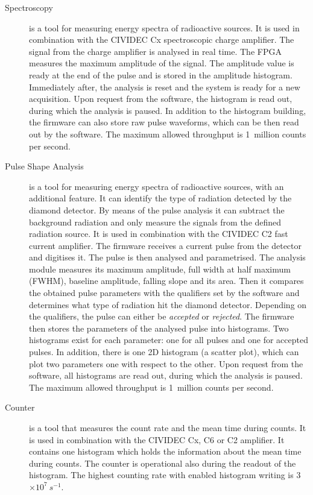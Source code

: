 \begin{description}
\item[Spectroscopy] is a tool for measuring energy spectra of radioactive sources. It is used in combination with the CIVIDEC Cx spectroscopic charge amplifier. The signal from the charge amplifier is analysed in real time. The FPGA measures the maximum amplitude of the signal. The amplitude value is ready at the end of the pulse and is stored in the amplitude histogram. Immediately after, the analysis is reset and the system is ready for a new acquisition. Upon request from the software, the histogram is read out, during which the analysis is paused. In addition to the histogram building, the firmware can also store raw pulse waveforms, which can be then read out by the software. The maximum allowed throughput is 1~million counts per second.

\item[Pulse Shape Analysis] is a tool for measuring energy spectra of radioactive sources, with an additional feature. It can identify the type of radiation detected by the diamond detector. By means of the pulse analysis it can subtract the background radiation and only measure the signals from the defined radiation source. It is used in combination with the CIVIDEC C2 fast current amplifier. The firmware receives a current pulse from the detector and digitises it. The pulse is then analysed and parametrised. The analysis module measures its maximum amplitude, full width at half maximum (FWHM), baseline amplitude, falling slope and its area. Then it compares the obtained pulse parameters with the qualifiers set by the software and determines what type of radiation hit the diamond detector. Depending on the qualifiers, the pulse can either be \emph{accepted} or \emph{rejected}. The firmware then stores the parameters of the analysed pulse into histograms. Two histograms exist for each parameter: one for all pulses and one for accepted pulses. In addition, there is one 2D histogram (a scatter plot), which can plot two parameters one with respect to the other. Upon request from the software, all histograms are read out, during which the analysis is paused. The maximum allowed throughput is 1~million counts per second.

\item[Counter] is a tool that measures the count rate and the mean time during counts. It is used in combination with the CIVIDEC Cx, C6 or C2 amplifier. It contains one histogram which holds the information about the mean time during counts. The counter is operational also during the readout of the histogram. The highest counting rate with enabled histogram writing is 3$\times10^7~s^{-1}$.
 
\end{description}



